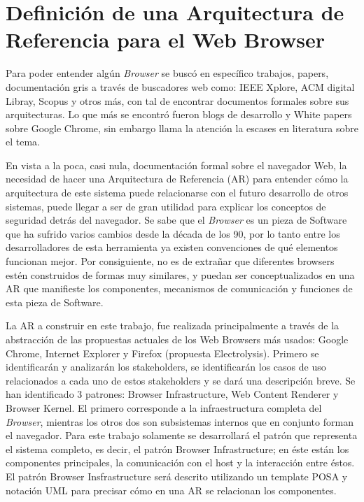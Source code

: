 \chapter{Definición de una Arquitectura de Referencia para el Web Browser}
\label{chap5:ArqRefWB}


Para poder entender algún \textit{Browser} se buscó en específico trabajos, papers, documentación gris a través de buscadores web como: IEEE Xplore, ACM digital Libray, Scopus y otros más, con tal de encontrar documentos formales sobre sus arquitecturas. Lo que más se encontró fueron blogs de desarrollo y White papers sobre Google Chrome, sin embargo llama la atención la escases en literatura sobre el tema. 


En vista a la poca, casi nula, documentación formal sobre el navegador Web, la necesidad de hacer una Arquitectura de Referencia (AR) para entender cómo la arquitectura de este sistema puede relacionarse con el futuro desarrollo de otros sistemas, puede llegar a ser de gran utilidad para explicar los conceptos de seguridad detrás del navegador. Se sabe que el \textit{Browser} es un pieza de Software que ha sufrido varios cambios desde la década de los 90, por lo tanto entre los desarrolladores de esta herramienta ya existen convenciones de qué elementos funcionan mejor. Por consiguiente, no es de extrañar que diferentes browsers estén construidos de formas muy similares, y puedan ser conceptualizados en una AR que manifieste los componentes, mecanismos de comunicación y funciones de esta pieza de Software. 


La AR a construir en este trabajo, fue realizada principalmente a través de la abstracción de las propuestas actuales de los Web Browsers más usados: Google Chrome, Internet Explorer y Firefox (propuesta Electrolysis). Primero se identificarán y analizarán los stakeholders, se identificarán los casos de uso relacionados a cada uno de estos stakeholders y se dará una descripción breve. Se han identificado 3 patrones: Browser Infrastructure, Web Content Renderer y Browser Kernel. El primero corresponde a la infraestructura completa del \textit{Browser}, mientras los otros dos son subsistemas internos que en conjunto forman el navegador. Para este trabajo solamente se desarrollará el patrón que representa el sistema completo, es decir, el patrón Browser Infrastructure; en éste están los componentes principales, la comunicación con el host y la interacción entre éstos. El patrón Browser Insfrastructure será descrito utilizando un template POSA \cite{buschman1996system} y notación UML para precisar cómo en una AR se relacionan los componentes. 

